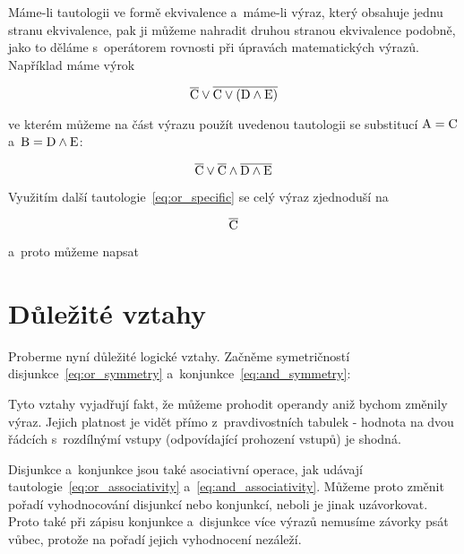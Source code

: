 Máme-li tautologii ve formě ekvivalence a~máme-li výraz, který obsahuje jednu stranu ekvivalence, pak ji můžeme nahradit druhou stranou ekvivalence podobně, jako to děláme s~operátorem rovnosti při úpravách matematických výrazů. Například máme výrok

\begin{equation}
\overline{\mathrm{C}} \lor \overline{\mathrm{C} \lor (\mathrm{D} \land \mathrm{E})}
\end{equation}

ve kterém můžeme na část výrazu použít uvedenou tautologii se substitucí \(\mathrm{A} = \mathrm{C}\) a~\(\mathrm{B} = \mathrm{D} \land \mathrm{E}\):

\begin{equation}
\overline{\mathrm{C}} \lor \overline{\mathrm{C}} \land \overline{\mathrm{D} \land \mathrm{E}}
\end{equation}

Využitím další tautologie~\eqref{eq:or_specific} se celý výraz zjednoduší na

\begin{equation}
\overline{\mathrm{C}}
\end{equation}

a~proto můžeme napsat


\section{Důležité vztahy}

Proberme nyní důležité logické vztahy. Začněme symetričností disjunkce~\eqref{eq:or_symmetry} a~konjunkce~\eqref{eq:and_symmetry}:


Tyto vztahy vyjadřují fakt, že můžeme prohodit operandy aniž bychom změnily výraz. Jejich platnost je vidět přímo z~pravdivostních tabulek - hodnota na dvou řádcích s~rozdílnýmí vstupy (odpovídající prohození vstupů) je shodná.

Disjunkce a~konjunkce jsou také asociativní operace, jak udávají tautologie~\eqref{eq:or_associativity} a~\eqref{eq:and_associativity}. Můžeme proto změnit pořadí vyhodnocování disjunkcí nebo konjunkcí, neboli je jinak uzávorkovat. Proto také při zápisu konjunkce a~disjunkce více výrazů nemusíme závorky psát vůbec, protože na pořadí jejich vyhodnocení nezáleží. 


